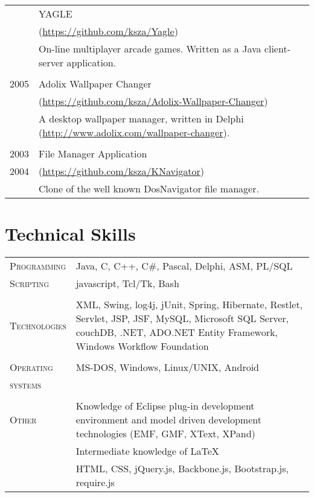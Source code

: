 \documentclass[a4paper,10pt]{article}
\begin{document}
\begin{longtable}{p{2.5cm}|p{11cm}}
 & YAGLE\\
 &\footnotesize{(\url{https://github.com/ksza/Yagle})}\\
 & \footnotesize{On-line multiplayer arcade games. Written as a Java
client-server application.}\\ \multicolumn{2}{c}{} \\
 
 \raggedleft \textsc{2005} & Adolix Wallpaper Changer \\
 &
 \footnotesize{(\url{https://github.com/ksza/Adolix-Wallpaper-Changer})}\\
 & \footnotesize{A
 desktop wallpaper manager, written in Delphi
 (\url{http://www.adolix.com/wallpaper-changer}).} \\
 \multicolumn{2}{c}{} \\
 
  \raggedleft \textsc{2003} & File Manager Application \\
  \raggedleft \textsc{2004} &
 \footnotesize{(\url{https://github.com/ksza/KNavigator})}\\
 & \footnotesize{Clone of the well known
DosNavigator file manager.} \\
\end{longtable}

\section{Technical Skills}
\begin{tabular}{p{2.5cm}p{11cm}}
\textsc{Programming} & Java, C, C++, C\#, Pascal, Delphi, ASM, PL/SQL\\
\textsc{Scripting} & javascript, Tcl/Tk, Bash\\ 
\multicolumn{2}{c}{} \\ 
\textsc{Technologies} & XML, Swing, log4j, jUnit, Spring, Hibernate, Restlet, Servlet, JSP, JSF, MySQL, Microsoft SQL Server, couchDB, .NET, ADO.NET Entity Framework, Windows Workflow Foundation\\ 
 \multicolumn{2}{c}{} \\
 \textsc{Operating} & MS-DOS, Windows, Linux/UNIX, Android\\
 \textsc{systems}&\\ 
 \multicolumn{2}{c}{} \\
 \textsc{Other} & Knowledge of Eclipse plug-in development environment and model
 driven development technologies (EMF, GMF, XText, XPand)\\
 & Intermediate knowledge of \LaTeX \\
 & HTML, CSS, jQuery.js, Backbone.js, Bootstrap.js, require.js\\
\end{tabular}
\end{document}

